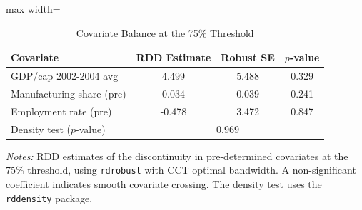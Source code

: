 \begin{table}[htbp]
\centering
\caption{Covariate Balance at the 75\% Threshold}
\label{tab:balance}
\begin{adjustbox}{max width=\textwidth}
\begin{tabular}{lccc}
\hline\hline
Covariate & RDD Estimate & Robust SE & $p$-value \\
\hline
GDP/cap 2002-2004 avg & 4.499 & 5.488 & 0.329 \\
Manufacturing share (pre) & 0.034 & 0.039 & 0.241 \\
Employment rate (pre) & -0.478 & 3.472 & 0.847 \\
\hline
Density test ($p$-value) & \multicolumn{3}{c}{0.969} \\
\hline\hline
\end{tabular}
\end{adjustbox}
\begin{tablenotes}[flushleft]\small
\item \textit{Notes:} RDD estimates of the discontinuity in pre-determined covariates at the 75\% threshold, using \texttt{rdrobust} with CCT optimal bandwidth. A non-significant coefficient indicates smooth covariate crossing. The density test uses the \texttt{rddensity} package.
\end{tablenotes}
\end{table}

